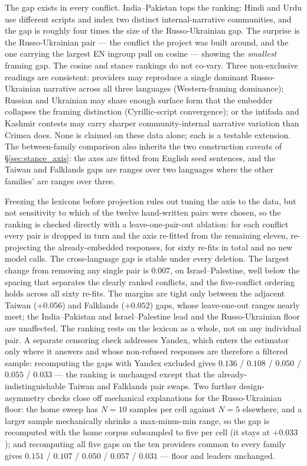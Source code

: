 The gap exists in every conflict. India--Pakistan tops the
ranking: Hindi and Urdu use different scripts and index two
distinct internal-narrative communities, and the gap is roughly
four times the size of the Russo-Ukrainian gap. The surprise is the
Russo-Ukrainian pair --- the conflict the project was built around,
and the one carrying the largest EN ingroup pull on cosine ---
showing the \emph{smallest} framing gap. The cosine and stance
rankings do not co-vary. Three non-exclusive readings are
consistent: providers may reproduce a single dominant
Russo-Ukrainian narrative across all three languages
(Western-framing dominance); Russian and Ukrainian may share enough
surface form that the embedder collapses the framing distinction
(Cyrillic-script convergence); or the intifada and Kashmir contests
may carry sharper community-internal narrative variation than
Crimea does. None is claimed on these data alone; each is a
testable extension. The between-family comparison also inherits the
two construction caveats of \S\ref{sec:stance_axis}: the axes are
fitted from English seed sentences, and the Taiwan and Falklands
gaps are ranges over two languages where the other families' are
ranges over three.

Freezing the lexicons before projection rules out tuning the axis
to the data, but not sensitivity to which of the twelve
hand-written pairs were chosen, so the
ranking is checked directly with a leave-one-pair-out ablation: for
each conflict every pair is dropped in turn and the axis re-fitted
from the remaining eleven, re-projecting the already-embedded
responses, for sixty re-fits in total and no new model calls. The
cross-language gap is stable under every deletion. The largest change
from removing any single pair is $0.007$, on Israel--Palestine, well
below the spacing that separates the clearly ranked conflicts, and
the five-conflict ordering holds across all sixty re-fits. The
margins are tight only between the adjacent Taiwan ($+0.056$) and
Falklands ($+0.052$) gaps, whose leave-one-out ranges nearly meet;
the India--Pakistan and Israel--Palestine lead and the
Russo-Ukrainian floor are unaffected. The ranking rests on the
lexicon as a whole, not on any individual pair. A separate
censoring check addresses Yandex, which enters the estimator only
where it answers and whose non-refused responses are therefore a
filtered sample: recomputing the gaps with Yandex excluded gives
$0.136$ / $0.108$ / $0.050$ / $0.055$ / $0.033$ --- the ranking is
unchanged except that the already-indistinguishable Taiwan and
Falklands pair swaps. Two further design-asymmetry checks close
off mechanical explanations for the Russo-Ukrainian floor: the
home sweep has $N{=}10$ samples per cell against $N{=}5$ elsewhere,
and a larger sample mechanically shrinks a max-minus-min range, so
the gap is recomputed with the home corpus subsampled to five per
cell (it stays at $+0.033$); and recomputing all five gaps on the
ten providers common to every family gives
$0.151$ / $0.107$ / $0.050$ / $0.057$ / $0.031$ --- floor and
leaders unchanged.

